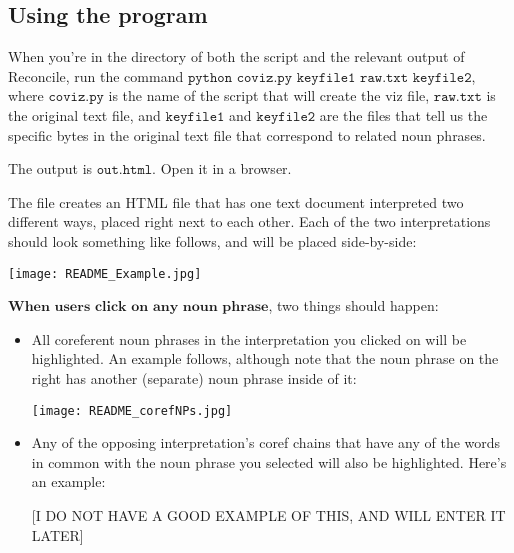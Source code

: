 \documentclass[a4paper]{article}
\begin{document}
\subsection*{Using the program}

When you're in the directory of both the script and the relevant output of Reconcile, run the command $\texttt{python coviz.py keyfile1 raw.txt keyfile2}$, where $\texttt{coviz.py}$ is the name of the script that will create the viz file, $\texttt{raw.txt}$ is the original text file, and $\texttt{keyfile1}$ and $\texttt{keyfile2}$ are the files that tell us the specific bytes in the original text file that correspond to related noun phrases.

The output is $\texttt{out.html}$. Open it in a browser.

The file creates an HTML file that has one text document interpreted two different ways, placed right next to each other. Each of the two interpretations should look something like follows, and will be placed side-by-side:

\texttt{[image: README\_Example.jpg]}

\noindent $\textbf{When users click on any noun phrase}$, two things should happen:

\begin{itemize}
\item All coreferent noun phrases in the interpretation you clicked on will be highlighted. An example follows, although note that the noun phrase on the right has another (separate) noun phrase inside of it:

\texttt{[image: README\_corefNPs.jpg]}

\item Any of the opposing interpretation's coref chains that have any of the words in common with the noun phrase you selected will also be highlighted. Here's an example:

[I DO NOT HAVE A GOOD EXAMPLE OF THIS, AND WILL ENTER IT LATER]
\end{itemize}
\end{document}
